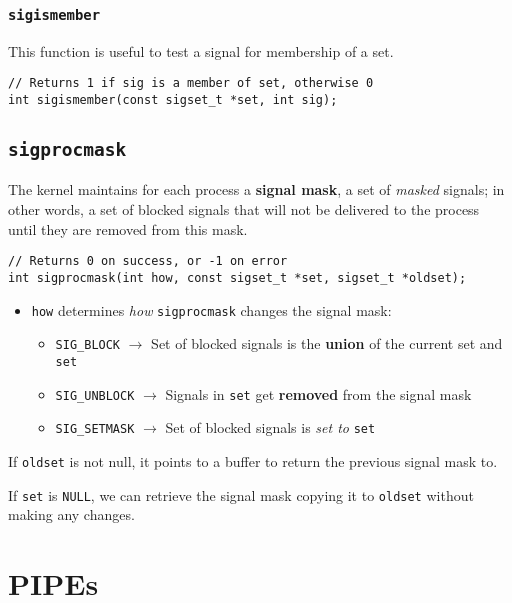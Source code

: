 \documentclass{article}
\begin{document}
\subsubsection{\texttt{sigismember}}

This function is useful to test a signal for membership of a set.

\begin{verbatim}
// Returns 1 if sig is a member of set, otherwise 0
int sigismember(const sigset_t *set, int sig);
\end{verbatim}


\subsection{\texttt{sigprocmask}}

The kernel maintains for each process a \textbf{signal mask}, a set of \textit{masked} signals; in other words, a set of blocked signals that will not be delivered to the process until they are removed from this mask.

\begin{verbatim}
// Returns 0 on success, or -1 on error
int sigprocmask(int how, const sigset_t *set, sigset_t *oldset);
\end{verbatim}

\begin{itemize}
    \item \texttt{how} determines \textit{how} \texttt{sigprocmask} changes the signal mask:
        \begin{itemize}
            \item \texttt{SIG\_BLOCK} $\rightarrow$ Set of blocked signals is the \textbf{union} of the current set and \texttt{set}
            \item \texttt{SIG\_UNBLOCK} $\rightarrow$ Signals in \texttt{set} get \textbf{removed} from the signal mask
            \item \texttt{SIG\_SETMASK} $\rightarrow$ Set of blocked signals is \textit{set to} \texttt{set}
        \end{itemize}
\end{itemize}

If \texttt{oldset} is not null, it points to a buffer to return the previous signal mask to.

If \texttt{set} is \texttt{NULL}, we can retrieve the signal mask copying it to \texttt{oldset} without making any changes.


\section{PIPEs}
\end{document}
